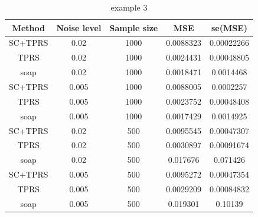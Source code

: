 \documentclass[a4paper,10pt]{amsart}
\begin{document}
\begin{table}[ht]
\begin{tabular}{c c c c c}\\
Method & Noise level & Sample size & MSE & se(MSE)\\
\hline
\hline
SC+TPRS & 0.02 & 1000 & 0.0088323 & 0.00022266\\
TPRS & 0.02 & 1000 & 0.0024431 & 0.00048805\\
soap & 0.02 & 1000 & 0.0018471 & 0.0014468\\
SC+TPRS & 0.005 & 1000 & 0.0088005 & 0.0002257\\
TPRS & 0.005 & 1000 & 0.0023752 & 0.00048408\\
soap & 0.005 & 1000 & 0.0017429 & 0.0014925\\
SC+TPRS & 0.02 & 500 & 0.0095545 & 0.00047307\\
TPRS & 0.02 & 500 & 0.0030897 & 0.00091674\\
soap & 0.02 & 500 & 0.017676 & 0.071426\\
SC+TPRS & 0.005 & 500 & 0.0095272 & 0.00047354\\
TPRS & 0.005 & 500 & 0.0029209 & 0.00084832\\
soap & 0.005 & 500 & 0.019301 & 0.10139\\
\end{tabular}
\caption{example 3}
\label{}
\end{table}
\end{document}

